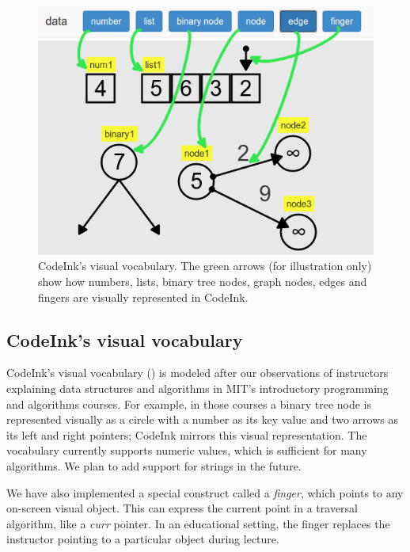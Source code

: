 \begin{figure} %

\begin{center}
\includegraphics[width=0.8\columnwidth]{img/visual-vocabulary.png}
\end{center}

\caption{CodeInk's visual vocabulary. The green arrows (for illustration only)
show how numbers, lists, binary tree nodes, graph nodes, edges and fingers are
visually represented in CodeInk.}

\label{fig:visual_vocab}
\end{figure}

\subsection{CodeInk's visual vocabulary}

CodeInk's visual vocabulary () is modeled after our
observations of instructors explaining data structures and algorithms in MIT's
introductory programming and algorithms courses. For example, in those courses a
binary tree node is represented visually as a circle with a number as its key
value and two arrows as its left and right pointers; CodeInk mirrors this visual
representation. The vocabulary currently supports numeric
values, which is sufficient for many algorithms. We plan to add support for
strings in the future.

We have also implemented a special construct called a \emph{finger}, which
points to any on-screen visual object. This can express the current point in a
traversal algorithm, like a \emph{curr} pointer. In an educational setting, the
finger replaces the instructor pointing to a particular object during lecture.

